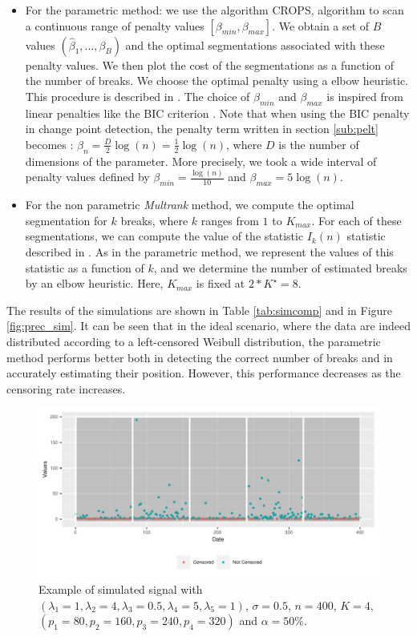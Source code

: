     \begin{itemize}
        \item For the parametric method: we use the algorithm CROPS, algorithm to scan a continuous range of penalty values $[\beta_{min},\beta_{max}]$. We obtain a set of $B$ values $(\hat \beta_1,...,\beta_B)$ and the optimal segmentations associated with these penalty values. We then plot the cost of the segmentations as a function of the number of breaks. We choose the optimal penalty using a elbow heuristic. This procedure is described in \cite{haynes2014}. The choice of $\beta_{min}$ and $\beta_{max}$ is inspired from linear penalties like the BIC criterion \cite{YAO1988181}. Note that when using the BIC penalty in change point detection, the penalty term written in section \ref{sub:pelt} becomes : $\beta_n = \frac{D}{2}\log(n) = \frac{1}{2}\log(n)$, where $D$ is the number of dimensions of the parameter. More precisely, we took a wide interval of penalty values defined by $\beta_{min} = \frac{\log(n)}{10}$ and $\beta_{max} = 5\log(n)$.
        \item For the non parametric \textit{Multrank} method, we compute the optimal segmentation for $k$ breaks, where $k$ ranges from $1$ to $K_{max}$. For each of these segmentations, we can compute the value of the statistic $I_k(n)$ statistic described in \cite{lung2015}. As in the parametric method, we represent the values of this statistic as a function of $k$, and we determine the number of estimated breaks by an elbow heuristic. Here, $K_{max}$ is fixed at $2*K^\star = 8$.
    \end{itemize}
The results of the simulations are shown in Table \ref{tab:simcomp} and in Figure \ref{fig:prec_sim}. It can be seen that in the ideal scenario, where the data are indeed distributed according to a left-censored Weibull distribution, the parametric method performs better both in detecting the correct number of breaks and in accurately estimating their position. However, this performance decreases as the censoring rate increases.

\begin{figure}[ht]
    \centering
    \includegraphics{figs/Chap4/Ex_sim.pdf}
    \caption{Example of simulated signal with $(\lambda_1 = 1, \lambda_2 = 4, \lambda_3 = 0.5, \lambda_4 = 5, \lambda_5 = 1)$, $\sigma = 0.5 $, $n = 400$, $K = 4$, $(p_1 = 80,p_2 = 160,p_3 = 240,p_4 = 320)$ and $\alpha = 50\%$.}
    \label{fig:ex_sim}
\end{figure}

